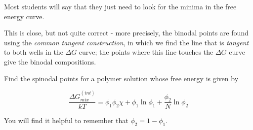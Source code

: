 \begin{activity}
\begin{ctqs}
		\begin{solution}[2.5in]
		
			Most students will say that they just need to look for the minima in the free energy curve.
			
			This is close, but not quite correct - more precisely, the binodal points are found using the \emph{common tangent construction}, in which we find the line that is \emph{tangent} to both wells in the $\Delta G$ curve; the points where this line touches the $\Delta G$ curve give the binodal compositions.
		
		
		\end{solution}
		
\end{ctqs}



\begin{exercises}
		
		\exercise Find the spinodal points for a polymer solution whose free energy is given by
		
			\begin{equation*}
				\frac{\Delta G_{mix}^{(int)}}{kT} = \phi_1\phi_2\chi + \phi_1\ln\phi_1 + \frac{\phi_2}{N}\ln\phi_2
			\end{equation*}
			
			You will find it helpful to remember that $\phi_2 = 1-\phi_1$.
		
			\begin{solution}
\end{solution}
\end{exercises}
\end{activity}
